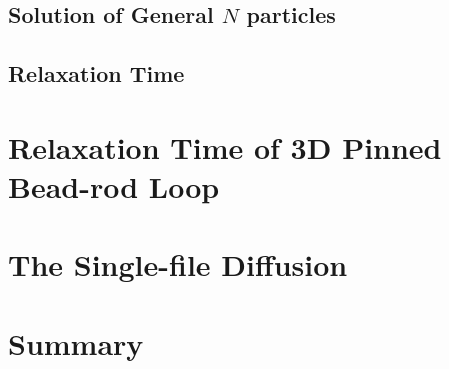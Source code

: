\subsection{Solution of General $N$ particles}
\label{sub:solution_of_general_n_particles}

\subsection{Relaxation Time}
\label{sub:relaxation_time}





\section{Relaxation Time of 3D Pinned Bead-rod Loop}
\label{sec:relaxation_time_of_3d_pinned_bead_rod_loop}


\section{The Single-file Diffusion}
\label{sec:the_single_file_diffusion}



\section{Summary}
\label{sec:summary}

